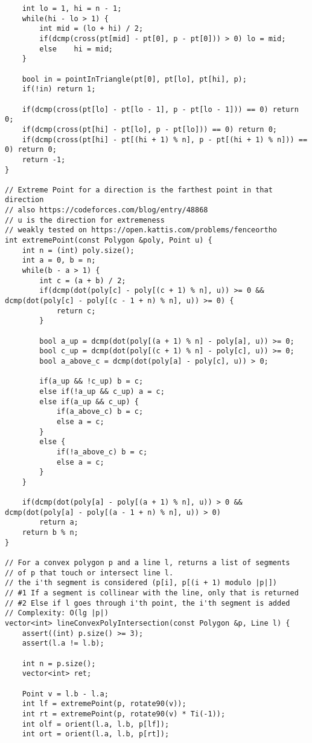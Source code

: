 \documentclass[FSZ,a4paper,onesided]{article}
\begin{document}
\begin{multicols*}{\COLS}
\begin{lstlisting}
    int lo = 1, hi = n - 1;
    while(hi - lo > 1) {
        int mid = (lo + hi) / 2;
        if(dcmp(cross(pt[mid] - pt[0], p - pt[0])) > 0) lo = mid;
        else    hi = mid;
    }

    bool in = pointInTriangle(pt[0], pt[lo], pt[hi], p);
    if(!in) return 1;

    if(dcmp(cross(pt[lo] - pt[lo - 1], p - pt[lo - 1])) == 0) return 0;
    if(dcmp(cross(pt[hi] - pt[lo], p - pt[lo])) == 0) return 0;
    if(dcmp(cross(pt[hi] - pt[(hi + 1) % n], p - pt[(hi + 1) % n])) == 0) return 0;
    return -1;
}

// Extreme Point for a direction is the farthest point in that direction
// also https://codeforces.com/blog/entry/48868
// u is the direction for extremeness
// weakly tested on https://open.kattis.com/problems/fenceortho
int extremePoint(const Polygon &poly, Point u) {
    int n = (int) poly.size();
    int a = 0, b = n;
    while(b - a > 1) {
        int c = (a + b) / 2;
        if(dcmp(dot(poly[c] - poly[(c + 1) % n], u)) >= 0 && dcmp(dot(poly[c] - poly[(c - 1 + n) % n], u)) >= 0) {
            return c;
        }

        bool a_up = dcmp(dot(poly[(a + 1) % n] - poly[a], u)) >= 0;
        bool c_up = dcmp(dot(poly[(c + 1) % n] - poly[c], u)) >= 0;
        bool a_above_c = dcmp(dot(poly[a] - poly[c], u)) > 0;

        if(a_up && !c_up) b = c;
        else if(!a_up && c_up) a = c;
        else if(a_up && c_up) {
            if(a_above_c) b = c;
            else a = c;
        }
        else {
            if(!a_above_c) b = c;
            else a = c;
        }
    }

    if(dcmp(dot(poly[a] - poly[(a + 1) % n], u)) > 0 && dcmp(dot(poly[a] - poly[(a - 1 + n) % n], u)) > 0)
        return a;
    return b % n;
}

// For a convex polygon p and a line l, returns a list of segments
// of p that touch or intersect line l.
// the i'th segment is considered (p[i], p[(i + 1) modulo |p|])
// #1 If a segment is collinear with the line, only that is returned
// #2 Else if l goes through i'th point, the i'th segment is added
// Complexity: O(lg |p|)
vector<int> lineConvexPolyIntersection(const Polygon &p, Line l) {
    assert((int) p.size() >= 3);
    assert(l.a != l.b);

    int n = p.size();
    vector<int> ret;

    Point v = l.b - l.a;
    int lf = extremePoint(p, rotate90(v));
    int rt = extremePoint(p, rotate90(v) * Ti(-1));
    int olf = orient(l.a, l.b, p[lf]);
    int ort = orient(l.a, l.b, p[rt]);


\end{lstlisting}
\end{multicols*}
\end{document}
